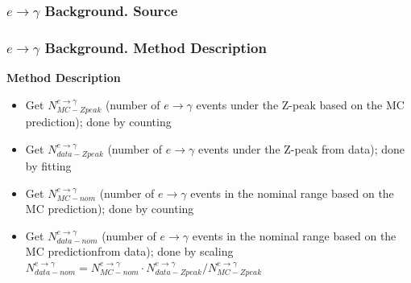 \begin{frame}\frametitle{$e\rightarrow\gamma$ Background. Source}

\end{frame}%

\begin{frame}\frametitle{$e\rightarrow\gamma$ Background. Method Description}
{\footnotesize\bfseries{Method Description}}
\scriptsize
\begin{itemize}
  \item Get $N_{MC-Zpeak}^{e\rightarrow\gamma}$ (number of $e\rightarrow\gamma$ events under the Z-peak based on the MC prediction); done by counting
  \item Get $N_{data-Zpeak}^{e\rightarrow\gamma}$ (number of $e\rightarrow\gamma$ events under the Z-peak from data); done by fitting
  \item Get $N_{MC-nom}^{e\rightarrow\gamma}$ (number of $e\rightarrow\gamma$ events in the nominal range based on the MC prediction); done by counting
  \item Get $N_{data-nom}^{e\rightarrow\gamma}$ (number of $e\rightarrow\gamma$ events in the nominal range based on the MC predictionfrom data); done by scaling {\footnotesize\bfseries{$N_{data-nom}^{e\rightarrow\gamma} = N_{MC-nom}^{e\rightarrow\gamma} \cdot N_{data-Zpeak}^{e\rightarrow\gamma}/N_{MC-Zpeak}^{e\rightarrow\gamma}$}}
\end{itemize}
\end{frame}%

